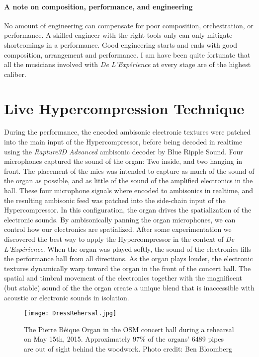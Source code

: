 \paragraph{A note on composition, performance, and engineering}
No amount of engineering can compensate for poor composition,
orchestration, or performance. A skilled engineer with the right tools
only can only mitigate shortcomings in a performance. Good engineering
starts and ends with good composition, arrangement and performance. I
am have been quite fortunate that all the musicians involved with
\textit{De L'Exp\'{e}rience} at every stage are of the highest
caliber.

\section{Live Hypercompression Technique}
\label{sec:live-hyperc-techn}
During the performance, the encoded ambisonic electronic textures were
patched into the main input of the Hypercompressor, before being
decoded in realtime using the \textit{Rapture3D Advanced} ambisonic
decoder by Blue Ripple
Sound.
Four microphones captured the sound of the organ: Two inside, and two
hanging in front. The placement of the mics was intended to capture as
much of the sound of the organ as possible, and as little of the sound
of the amplified electronics in the hall. These four microphone
signals where encoded to ambisonics in realtime, and the resulting
ambisonic feed was patched into the side-chain input of the
Hypercompressor. In this configuration, the organ drives the
spatialization of the electronic sounds. By ambisonically panning the
organ microphones, we can control how our electronics are
spatialized. After some experimentation we discovered the best way to
apply the Hypercompressor in the context of \textit{De
  L'Exp\'{e}rience}. When the organ was played softly, the sound of
the electronics fills the performance hall from all directions. As the
organ plays louder, the electronic textures dynamically warp toward
the organ in the front of the concert hall. The spatial and timbral
movement of the electronics together with the magnificent (but stable)
sound of the the organ create a unique blend that is inaccessible with
acoustic or electronic sounds in isolation.

\begin{figure*}[]
  \texttt{[image: DressRehersal.jpg]}
  \caption{The Pierre B\'{e}ique Organ in the OSM concert hall during
    a rehearsal on May 15th, 2015. Approximately 97\% of the organs'
    6489 pipes are out of sight behind the woodwork. Photo credit: Ben
    Bloomberg}
  \label{fig:le-corbusier-sketch}
\end{figure*}


